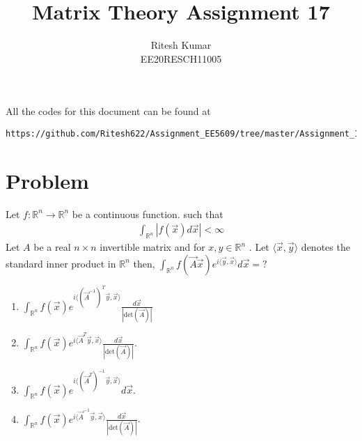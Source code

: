 \documentclass[journal,12pt,twocolumn]{IEEEtran}
\numberwithin{table}{section}
\begin{document}
     \def\rightbox#1{\makebox[0in][r]{#1}}
     \def\centbox#1{\makebox[0in]{#1}}
     \def\topbox#1{\raisebox{-\baselineskip}[0in][0in]{#1}}
     \def\midbox#1{\raisebox{-0.5\baselineskip}[0in][0in]{#1}}
\vspace{3cm}
\title{Matrix Theory Assignment 17}
\author{Ritesh Kumar \\ EE20RESCH11005}
\maketitle
\newpage
\bigskip
\renewcommand{\thefigure}{\theenumi}
\renewcommand{\thetable}{\theenumi}
All the codes for this document can be found at
%
\begin{lstlisting}
https://github.com/Ritesh622/Assignment_EE5609/tree/master/Assignment_17
\end{lstlisting}
%
	\section{Problem}
Let $f : \mathbb{R}^n  \rightarrow \mathbb{R}^n $ be a continuous  function. such that
\begin{align}
\int_{\mathbb{R}^n} \left | f(\vec{x})d\vec{x} \right | < \infty
\end{align}
Let $A$ be a real $n  \times n$ invertible matrix and  for $x,y \in \mathbb{R}^n$ . Let $ \langle \vec{x},\vec{y} \rangle $ denotes the standard inner product in $\mathbb{R}^n$ then,
$\int_{\mathbb{R}^n} f(\vec{A}\vec{x}) e^{i \langle \vec{y},\vec{x} \rangle} d\vec{x}  = ?$ \\



\begin{enumerate}
\item $\int_{\mathbb{R}^n} f(\vec{x}) e^{i\langle (\vec{A}^{-1})^{T}\vec{y},\vec{x} \rangle} \frac{d\vec{x}}{\left | \text{det} (\vec{A}) \right |} $\\
\item $\int_{\mathbb{R}^n} f(\vec{x}) e^{i \langle \vec{A}^{T}\vec{y},\vec{x} \rangle } \frac{d\vec{x}}{\left | \text{det} (\vec{A}) \right |} $.\\
\item$\int_{\mathbb{R}^n} f(\vec{x}) e^{i \langle (\vec{A}^{T})^{-1}\vec{y},\vec{x} \rangle }d\vec{x} $.\\
\item $\int_{\mathbb{R}^n} f(\vec{x}) e^{i \langle \vec{A}^{-1}\vec{y},\vec{x} \rangle} \frac{d\vec{x}}{\left | \text{det} (\vec{A}) \right |} $.\\
\end{enumerate}
\end{document}
